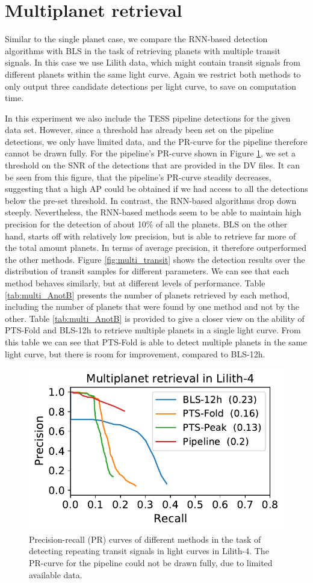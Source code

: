 
\section{Multiplanet retrieval}
\label{sec:multis}

Similar to the single planet case, we compare the RNN-based detection algorithms with BLS in the task of retrieving planets with multiple transit signals. In this case we use Lilith data, which might contain transit signals from different planets within the same light curve. Again we restrict both methods to only output three candidate detections per light curve, to save on computation time.

In this experiment we also include the TESS pipeline detections for the given data set. However, since a threshold has already been set on the pipeline detections, we only have limited data, and the PR-curve for the pipeline therefore cannot be drawn fully. For the pipeline's PR-curve shown in Figure \ref{fig:multi_pr}, we set a threshold on the SNR of the detections that are provided in the DV files. It can be seen from this figure, that the pipeline's PR-curve steadily decreases, suggesting that a high AP could be obtained if we had access to all the detections below the pre-set threshold. In contrast, the RNN-based algorithms drop down steeply. Nevertheless, the RNN-based methods seem to be able to maintain high precision for the detection of about 10\% of all the planets. BLS on the other hand, starts off with relatively low precision, but is able to retrieve far more of the total amount planets. In terms of average precision, it therefore outperformed the other methods. Figure \ref{fig:multi_transit} shows the detection results over the distribution of transit samples for different parameters. We can see that each method behaves similarly, but at different levels of performance. Table \ref{tab:multi_AnotB} presents the number of planets retrieved by each method, including the number of planets that were found by one method and not by the other. Table \ref{tab:multi_AnotB} is provided to give a closer view on the ability of PTS-Fold and BLS-12h to retrieve multiple planets in a single light curve. From this table we can see that PTS-Fold is able to detect multiple planets in the same light curve, but there is room for improvement, compared to BLS-12h.

\begin{figure}
    \centering
    \includegraphics[width=0.35\linewidth]{Experiments/Figures/Multis/multi_pr.pdf}
    \caption{Precision-recall (PR) curves of different methods in the task of detecting repeating transit signals in light curves in Lilith-4. The PR-curve for the pipeline could not be drawn fully, due to limited available data.}
    \label{fig:multi_pr}
\end{figure}

